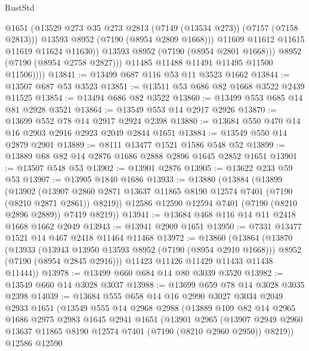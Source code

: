 \begin{lexlean}{RustStd}
\begin{coremodule}
                      @1651
                      (@13529 @273 @35 @273 @2813 (@7149 (@13534 @273)) (@7157 (@7158 @2813)))
                      @13593
                      @8952
                      (@7190 (@8954 @2809 @1668)))
                    @11609
                    @11612
                    @11615
                    @11619
                    @11624
                    @11630))
                @13593
                @8952
                (@7190 (@8954 @2801 @1668)))
              @8952
              (@7190 (@8954 @2758 @2827)))
            @11485
            @11488
            @11491
            @11495
            @11500
            @11506))))
@13841 := @13499 @687 @116 @53 @11 @3523 @1662
@13844 := @13507 @687 @53 @3523
@13851 := @13511 @53 @686 @82 @1668 @3522 @2439 @11525
@13854 := @13494 @686 @82 @3522
@13860 := @13499 @553 @685 @14 @81 @2928 @3521
@13864 := @13549 @553 @14 @2917 @2926
@13870 := @13699 @552 @78 @14 @2917 @2924 @2398
@13880 := @13684 @550 @470 @14 @16 @2903 @2916 @2923 @2049 @2844 @1651
@13884 := @13549 @550 @14 @2879 @2901
@13889 := @8111 @13477 @1521 @1586 @548 @52
@13899 := @13889 @68 @82 @14 @2876 @1686 @2888 @2896 @1645 @2852 @1651
@13901 := @13507 @548 @53
@13902 := @13901 @2876
@13905 := @13622 @233 @59 @53
@13907 := @13905 @1840 @1686
@13933 := @13880
    (@13884
      (@13899
        (@13902
          (@13907 @2860 @2871 @13637 @11865 @8190 @12574 @7401 (@7190 (@8210 @2871 @2861)) @8219))
        @12586
        @12590
        @12594
        @7401
        (@7190 (@8210 @2896 @2889))
        @7419
        @8219))
@13941 := @13684 @468 @116 @14 @11 @2418 @1668 @1662 @2049
@13943 := @13941 @2909 @1651
@13950 := @7331 @13477 @1521 @14 @467 @2418 @11464 @11468
@13972 := @13860
    (@13864
      (@13870
        (@13933
          (@13943 @13950 @13593 @8952 (@7190 (@8954 @2910 @1668)))
          @8952
          (@7190 (@8954 @2845 @2916)))
        @11423
        @11426
        @11429
        @11433
        @11438
        @11444))
@13978 := @13499 @660 @684 @14 @80 @3039 @3520
@13982 := @13549 @660 @14 @3028 @3037
@13988 := @13699 @659 @78 @14 @3028 @3035 @2398
@14039 := @13684
    @555
    @658
    @14
    @16
    @2990
    @3027
    @3034
    @2049
    @2933
    @1651
    (@13549
      @555
      @14
      @2968
      @2988
      (@13889
        @109
        @82
        @14
        @2965
        @1686
        @2975
        @2983
        @1645
        @2941
        @1651
        (@13901
          @2965
          (@13907 @2949 @2960 @13637 @11865 @8190 @12574 @7401 (@7190 (@8210 @2960 @2950)) @8219))
        @12586
        @12590

\end{coremodule}
\end{lexlean}
